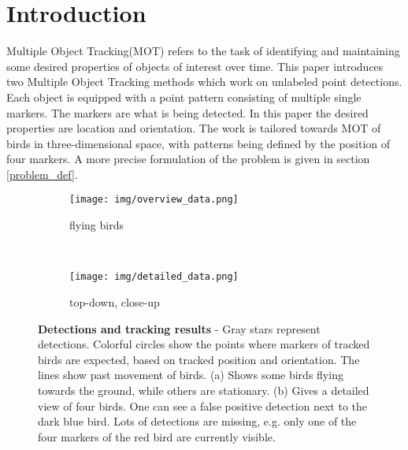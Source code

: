 \documentclass[12pt,a4paper]{article}
\begin{document}
\section{Introduction}
Multiple Object Tracking(MOT) refers to the task of identifying and maintaining some desired properties of objects of interest over time.
This paper introduces two Multiple Object Tracking methods which work on unlabeled point detections. Each object is equipped with a point pattern consisting of multiple single markers. The markers are what is being detected. In this paper the desired properties are location and orientation. The work is tailored towards MOT of birds in three-dimensional space, with patterns being defined by the position of four markers. A more precise formulation of the problem is given in section \ref{problem_def}.
\begin{figure}[!htbp]
	\centering
	\begin{subfigure}[b]{0.42\textwidth}
		\texttt{[image: img/overview\_data.png]}
		\caption{flying birds}
	\end{subfigure} ~
	\begin{subfigure}[b]{0.455\textwidth}
			\texttt{[image: img/detailed\_data.png]}
		\caption{top-down, close-up}
	\end{subfigure}
	\vspace{\baselineskip}
	\caption{\textbf{Detections and tracking results} - Gray stars represent detections. Colorful circles show the points where markers of tracked birds are expected, based on tracked position and orientation. The lines show past movement of birds. (a) Shows some birds flying towards the ground, while others are stationary. (b) Gives a detailed view of four birds. One can see a false positive detection next to the dark blue bird. Lots of detections are missing, e.g. only one of the four markers of the red bird are currently visible.}
    \label{data_impression}
\end{figure}
\end{document}
